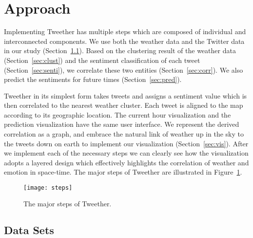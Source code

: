 \section{Approach}

Implementing Tweether has multiple steps which are composed of individual and interconnected components. We use both the weather data and the Twitter data in our study (Section~\ref{sec:dataset}). Based on the clustering result of the weather data (Section~\ref{sec:clust}) and the sentiment classification of each tweet (Section~\ref{sec:senti}), we correlate these two entities (Section~\ref{sec:corr}). We also predict the sentiments for future times (Section~\ref{sec:pred}).

Tweether in its simplest form takes tweets and assigns a sentiment value which is then correlated to the nearest weather cluster. Each tweet is aligned to the map according to its geographic location. The current hour visualization and the prediction visualization have the same user interface. We represent the derived correlation as a graph, and embrace the natural link of weather up in the sky to the tweets down on earth to implement our visualization (Section~\ref{sec:vis}). After we implement each of the necessary steps we can clearly see how the visualization adopts a layered design which effectively highlights the correlation of weather and emotion in space-time. The major steps of Tweether are illustrated in Figure~\ref{fig:steps}.

\begin{figure}[t]
 \centering
 \texttt{[image: steps]}
 \caption{The major steps of Tweether.}
 \label{fig:steps}
\end{figure}



\subsection{Data Sets}
\label{sec:dataset}

